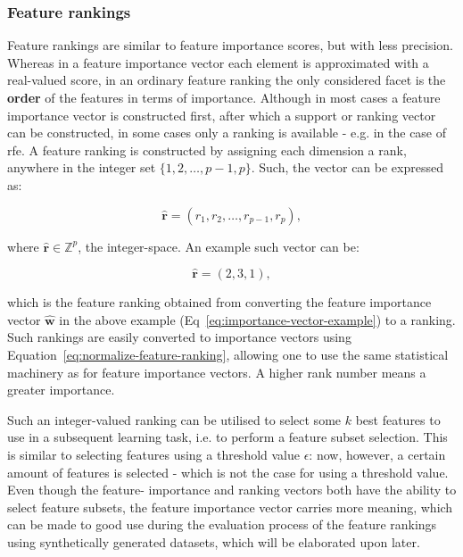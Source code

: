 \documentclass{article}
\begin{document}
\subsubsection{Feature rankings}\label{section:feature-rankings-definition}
Feature rankings are similar to feature importance scores, but with less precision. Whereas in a feature importance vector each element is approximated with a real-valued score, in an ordinary feature ranking the only considered facet is the \textbf{order} of the features in terms of importance. Although in most cases a feature importance vector is constructed first, after which a support or ranking vector can be constructed, in some cases only a ranking is available - e.g. in the case of \gls{rfe}. A feature ranking is constructed by assigning each dimension a rank, anywhere in the integer set $\{1, 2, \ldots, p - 1, p\}$. Such, the vector can be expressed as:

\begin{equation}
\hat{\boldsymbol{r}} = (r_1, r_2, \ldots, r_{p-1}, r_p),
\end{equation}

where $\hat{\boldsymbol{r}} \in \mathbb{Z}^p$, the integer-space. An example such vector can be:

\begin{equation}\hat{\boldsymbol{r}} = (2, 3, 1),\end{equation}

which is the feature ranking obtained from converting the feature importance vector $\hat{\boldsymbol{w}}$ in the above example (Eq~\ref{eq:importance-vector-example}) to a ranking. Such rankings are easily converted to importance vectors using Equation~\ref{eq:normalize-feature-ranking}, allowing one to use the same statistical machinery as for feature importance vectors. A higher rank number means a greater importance.

Such an integer-valued ranking can be utilised to select some $k$ best features to use in a subsequent learning task, i.e. to perform a feature subset selection. This is similar to selecting features using a threshold value $\epsilon$: now, however, a certain amount of features is selected - which is not the case for using a threshold value. Even though the feature- importance and ranking vectors both have the ability to select feature subsets, the feature importance vector carries more meaning, which can be made to good use during the evaluation process of the feature rankings using synthetically generated datasets, which will be elaborated upon later.
\end{document}
